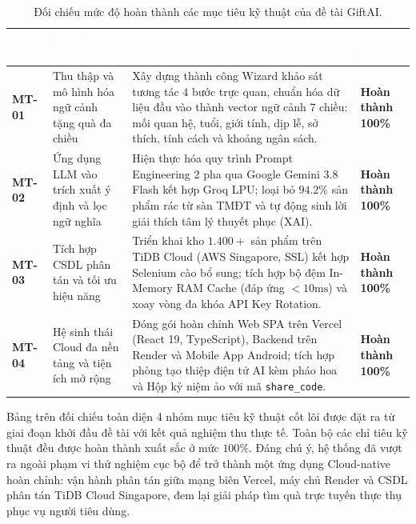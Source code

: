 \begin{table}[htbp]
\centering
\caption{Đối chiếu mức độ hoàn thành các mục tiêu kỹ thuật của đề tài GiftAI.}
\label{tab:goal_evaluation}
\small
\renewcommand{\arraystretch}{1.25}
\begin{tabularx}{\textwidth}{|p{1.4cm}|p{3.5cm}|X|p{1.8cm}|}
\hline
\rowcolor{PrimaryBlue}
\textcolor{white}{\textbf{Mục tiêu}} & 
\textcolor{white}{\textbf{Yêu cầu kỹ thuật}} & 
\textcolor{white}{\textbf{Kết quả thực tế đạt được}} & 
\textcolor{white}{\textbf{Đánh giá}} \\
\hline
\textbf{MT-01} & Thu thập và mô hình hóa ngữ cảnh tặng quà đa chiều & Xây dựng thành công Wizard khảo sát tương tác 4 bước trực quan, chuẩn hóa dữ liệu đầu vào thành vector ngữ cảnh 7 chiều: mối quan hệ, tuổi, giới tính, dịp lễ, sở thích, tính cách và khoảng ngân sách. & \textbf{Hoàn thành 100\%} \\
\hline
\textbf{MT-02} & Ứng dụng LLM vào trích xuất ý định và lọc ngữ nghĩa & Hiện thực hóa quy trình Prompt Engineering 2 pha qua Google Gemini 3.8 Flash kết hợp Groq LPU; loại bỏ $94.2\%$ sản phẩm rác từ sàn TMĐT và tự động sinh lời giải thích tâm lý thuyết phục (XAI). & \textbf{Hoàn thành 100\%} \\
\hline
\textbf{MT-03} & Tích hợp CSDL phân tán và tối ưu hiệu năng & Triển khai kho $1.400+$ sản phẩm trên TiDB Cloud (AWS Singapore, SSL) kết hợp Selenium cào bổ sung; tích hợp bộ đệm In-Memory RAM Cache (đáp ứng $<10\text{ms}$) và xoay vòng đa khóa API Key Rotation. & \textbf{Hoàn thành 100\%} \\
\hline
\textbf{MT-04} & Hệ sinh thái Cloud đa nền tảng và tiện ích mở rộng & Đóng gói hoàn chỉnh Web SPA trên Vercel (React 19, TypeScript), Backend trên Render và Mobile App Android; tích hợp phòng tạo thiệp điện tử AI kèm pháo hoa và Hộp kỷ niệm ảo với mã \texttt{share\_code}. & \textbf{Hoàn thành 100\%} \\
\hline
\end{tabularx}
\end{table}

Bảng trên đối chiếu toàn diện 4 nhóm mục tiêu kỹ thuật cốt lõi được đặt ra từ giai đoạn khởi đầu đề tài với kết quả nghiệm thu thực tế. Toàn bộ các chỉ tiêu kỹ thuật đều được hoàn thành xuất sắc ở mức $100\%$. Đáng chú ý, hệ thống đã vượt ra ngoài phạm vi thử nghiệm cục bộ để trở thành một ứng dụng Cloud-native hoàn chỉnh: vận hành phân tán giữa mạng biên Vercel, máy chủ Render và CSDL phân tán TiDB Cloud Singapore, đem lại giải pháp tìm quà trực tuyến thực thụ phục vụ người tiêu dùng.


